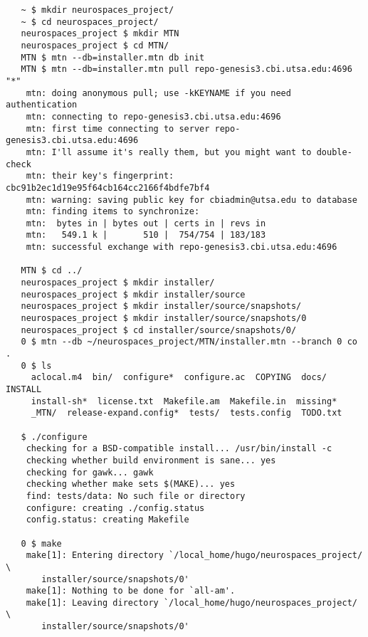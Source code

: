 \documentclass[12pt]{article}
\begin{document}
\begin{verbatim}
   ~ $ mkdir neurospaces_project/
   ~ $ cd neurospaces_project/
   neurospaces_project $ mkdir MTN
   neurospaces_project $ cd MTN/
   MTN $ mtn --db=installer.mtn db init
   MTN $ mtn --db=installer.mtn pull repo-genesis3.cbi.utsa.edu:4696 "*"
    mtn: doing anonymous pull; use -kKEYNAME if you need authentication
    mtn: connecting to repo-genesis3.cbi.utsa.edu:4696
    mtn: first time connecting to server repo-genesis3.cbi.utsa.edu:4696
    mtn: I'll assume it's really them, but you might want to double-check
    mtn: their key's fingerprint: cbc91b2ec1d19e95f64cb164cc2166f4bdfe7bf4
    mtn: warning: saving public key for cbiadmin@utsa.edu to database
    mtn: finding items to synchronize:
    mtn:  bytes in | bytes out | certs in | revs in
    mtn:   549.1 k |       510 |  754/754 | 183/183
    mtn: successful exchange with repo-genesis3.cbi.utsa.edu:4696

   MTN $ cd ../
   neurospaces_project $ mkdir installer/
   neurospaces_project $ mkdir installer/source
   neurospaces_project $ mkdir installer/source/snapshots/
   neurospaces_project $ mkdir installer/source/snapshots/0
   neurospaces_project $ cd installer/source/snapshots/0/
   0 $ mtn --db ~/neurospaces_project/MTN/installer.mtn --branch 0 co .
   0 $ ls
     aclocal.m4  bin/  configure*  configure.ac  COPYING  docs/  INSTALL
     install-sh*  license.txt  Makefile.am  Makefile.in  missing* 
     _MTN/  release-expand.config*  tests/  tests.config  TODO.txt

   $ ./configure 
    checking for a BSD-compatible install... /usr/bin/install -c
    checking whether build environment is sane... yes
    checking for gawk... gawk
    checking whether make sets $(MAKE)... yes
    find: tests/data: No such file or directory
    configure: creating ./config.status
    config.status: creating Makefile

   0 $ make
    make[1]: Entering directory `/local_home/hugo/neurospaces_project/  \
       installer/source/snapshots/0'
    make[1]: Nothing to be done for `all-am'.
    make[1]: Leaving directory `/local_home/hugo/neurospaces_project/  \
       installer/source/snapshots/0'


\end{verbatim}
\end{document}
